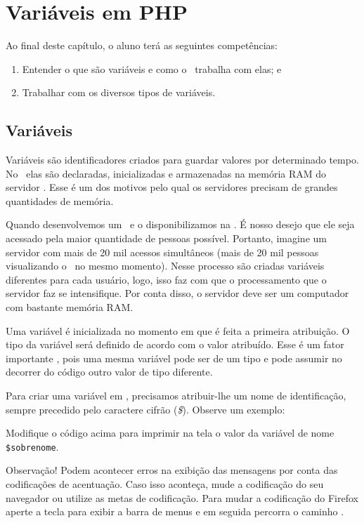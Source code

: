 \chapter{Variáveis em PHP}

Ao final deste capítulo, o aluno terá as seguintes competências:
\begin{enumerate}
    \item Entender o que são variáveis e como o \php~trabalha com elas; e
    \item Trabalhar com os diversos tipos de variáveis.
\end{enumerate}

\section{Variáveis}
\label{variaveis}

Variáveis são identificadores criados para guardar valores por determinado tempo. 
No \php~elas são declaradas, inicializadas e armazenadas na memória RAM do servidor \web. 
Esse é um dos motivos pelo qual os servidores precisam de grandes quantidades de memória.

Quando desenvolvemos um \site~e o disponibilizamos na \internet. É nosso desejo que ele seja
acessado pela maior quantidade de pessoas possível. Portanto, imagine um servidor com mais 
de 20 mil acessos simultâneos (mais de 20 mil pessoas visualizando o \site~no mesmo momento).
Nesse processo são criadas variáveis diferentes para cada usuário, logo, isso faz com que o 
processamento que o servidor faz se intensifique. Por conta disso, o servidor deve ser um 
computador com bastante memória RAM.

Uma variável é inicializada no momento em que é feita a primeira atribuição. O tipo da
variável será definido de acordo com o valor atribuído. Esse é um fator importante \php, 
pois uma mesma variável pode ser de um tipo e pode assumir no decorrer do código outro 
valor de tipo diferente.

Para criar uma variável em \php, precisamos atribuir-lhe um nome de identificação, 
sempre precedido pelo caractere cifrão (\textit{\$}). Observe um exemplo:



Modifique o código acima para imprimir na tela o valor da variável de 
nome \texttt{\$sobrenome}.

Observação! Podem acontecer erros na exibição das mensagens por conta 
das codificações de acentuação. Caso isso aconteça, mude a codificação 
do seu navegador ou utilize as metas de codificação. Para mudar a codificação
do Firefox aperte a tecla \keys{\Alt} para exibir a barra de menus e em seguida
percorra o caminho .

